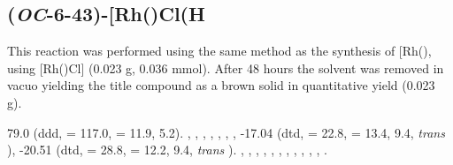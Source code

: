  
\subsection*{(\emph{OC}-6-43)-\texorpdfstring{[Rh(\tBuxantphosk)Cl(H\ce{)2]}} R}


This reaction was performed using the same method as the synthesis of [Rh(\tBusixantphos)\ce{Cl(H)2]}, using [Rh(\tBuxantphos)Cl] (0.023 g, 0.036 mmol).  After 48 hours the solvent was removed in vacuo yielding the title compound as a brown solid in quantitative yield (0.023 g).

79.0 (ddd, \JRhP{} = 117.0, \JPH{} = 11.9, 5.2).
,
,
,
,
,
,
,
-17.04 (dtd, \JRhH{} = 22.8, \JPH{} = 13.4, \JHH{} 9.4,  \emph{trans} ),
-20.51 (dtd, \JRhH{} = 28.8, \JPH{} = 12.2, \JHH{} 9.4,  \emph{trans} ).
,
,
,
,
,
,
,
,
,
,
,
.

%
%
%
%

